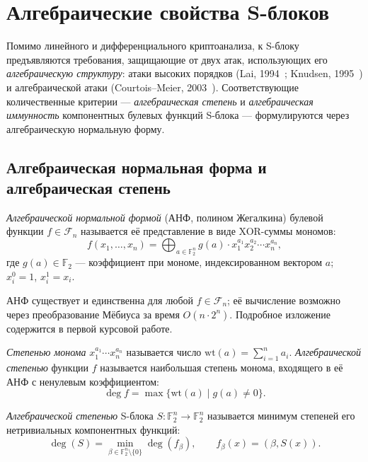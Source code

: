 \newpage
\section{Алгебраические свойства S-блоков}

Помимо линейного и дифференциального криптоанализа, к S-блоку
предъявляются требования, защищающие от двух атак, использующих его
\emph{алгебраическую структуру}: атаки высоких порядков (Lai,
1994~\cite{lai1994higher}; Knudsen, 1995~\cite{knudsen1995truncated})
и алгебраической атаки (Courtois–Meier, 2003~\cite{courtois2003algebraic}).
Соответствующие количественные критерии — \emph{алгебраическая степень}
и \emph{алгебраическая иммунность} компонентных булевых функций
S-блока — формулируются через алгебраическую нормальную форму.

\subsection{Алгебраическая нормальная форма и алгебраическая степень}

\begin{definition}
\emph{Алгебраической нормальной формой} (АНФ, полином Жегалкина) булевой
функции $f \in \mathcal{F}_n$ называется её представление в виде
XOR-суммы мономов:
\[
    f(x_1, \dots, x_n) = \bigoplus_{a \in \mathbb{F}_2^n} g(a) \cdot x_1^{a_1} x_2^{a_2} \cdots x_n^{a_n},
\]
где $g(a) \in \mathbb{F}_2$ — коэффициент при мономе, индексированном
вектором $a$; $x_i^0 = 1$, $x_i^1 = x_i$.
\end{definition}

АНФ существует и единственна для любой $f \in \mathcal{F}_n$; её
вычисление возможно через преобразование Мёбиуса за время
$O(n \cdot 2^n)$. Подробное изложение содержится в первой курсовой
работе.

\begin{definition}
\emph{Степенью монома} $x_1^{a_1} \cdots x_n^{a_n}$ называется число
$\mathrm{wt}(a) = \sum_{i=1}^n a_i$. \emph{Алгебраической степенью}
функции $f$ называется наибольшая степень монома, входящего в её АНФ
с ненулевым коэффициентом:
\[
    \deg f = \max\{\mathrm{wt}(a) \mid g(a) \neq 0\}.
\]
\end{definition}

\begin{definition}
\emph{Алгебраической степенью} S-блока $S: \mathbb{F}_2^n \to \mathbb{F}_2^n$
называется минимум степеней его нетривиальных компонентных функций:
\[
    \deg(S) = \min_{\beta \in \mathbb{F}_2^n \setminus \{0\}} \deg(f_\beta), \qquad f_\beta(x) = (\beta, S(x)).
\]
\end{definition}

